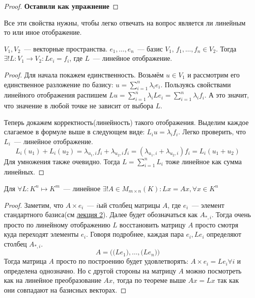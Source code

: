 \begin{proof}
    \textbf{Оставили как упражнение}
\end{proof}
\begin{motivation}
    Все эти свойства нужны, чтобы легко отвечать на вопрос является ли линейным то или иное отображение.
\end{motivation}
\begin{theorem}
    $V_1, V_2$~--- векторные пространства. $e_1,\dots,e_n$~--- базис $V_1$, $f_1,\dots,f_n\in V_2$.
    Тогда $\exists! L: V_1\to V_2\colon Le_i = f_i$, где $L$~--- линейное отображение.
\end{theorem}
\begin{proof}
    Для начала покажем единственность. Возьмём $u\in V_1$ и рассмотрим его единственное разложение по базису:
    $u = \sum\limits_{i=1}^{n}\lambda_ie_i$. Пользуясь свойствами линейного отображения распишем $Lu=
    \sum \limits_{i=1}^{n} \lambda_iLe_i = \sum \limits_{i=1}^{n} \lambda_i f_i$. А это значит, что значение
    в любой точке не зависит от выбора $L$.

    Теперь докажем корректность(линейность) такого отображения. Выделим каждое слагаемое в формуле выше 
    в следующем виде: $L_iu = \lambda_if_i$. Легко проверить, что $L_i$~--- линейное отображение.
    $$L_i(u_1) + L_i(u_2) =
    \lambda_{u_1,i}f_i + \lambda_{u_2,i}f_i=
    (\lambda_{u_1,i}+\lambda_{u_2,i})f_i=L_i(u_1 + u_2)$$
    Для умножения также очевидно. Тогда $L = \sum\limits_{i=1}^{n} L_i$
    тоже линейное как сумма линейных.
\end{proof}
\begin{follow}
    Для $\forall L: K^n\mapsto K^m$~--- линейное 
    $\exists! A\in M_{m\times n}(K)\colon Lx = Ax,\forall x\in K^n$
\end{follow}
\begin{proof}
    Заметим, что $A\times e_i$~--- $i$ый столбец матрицы $A$, где $e_i$~--- элемент стандартного базиса(см \hyperref[2]{лекция 2}).
    Далее будет обозначаться как $A_{*,i}$. Тогда очень просто по линейному отображению $L$ восстановить
    матрицу $A$ просто смотря куда переходят элементы $e_i$.
    Говоря подробнее, каждая пара $e_i, Le_i$ определяют столбец $A_{*,i}$.
    $$A=\Big(\big(Le_1\big),\dots,\big(Le_n\big)\Big)$$
    Тогда матрица $A$ просто по построению будет удовлетворять: $A \times e_i = L e_i \forall i$
    и определена однозначно. Но с другой стороны на матрицу $A$ можно посмотреть как на линейное
    преобразование $Ax$, тогда по теореме выше $Ax=Lx$ так как они совпадают на базисных векторах.
\end{proof}
